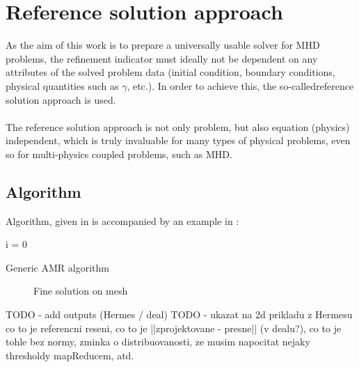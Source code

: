 \section{Reference solution approach}
As the aim of this work is to prepare a universally usable solver for MHD problems, the refinement indicator  must ideally not be dependent on any attributes of the solved problem data (initial condition, boundary conditions, physical quantities such as $\gamma$, etc.). In order to achieve this, the so-called{reference solution} approach is used.
\paragraph{}
The reference solution approach is not only problem, but also equation (physics) independent, which is truly invaluable for many types of physical problems, even so for multi-physics coupled problems, such as MHD.
\subsection{Algorithm}
Algorithm, given in  is accompanied by an example in :\ \\
\begin{algorithm}[H]
\label{AMRRef}
 i = 0\\
 \caption{Generic AMR algorithm}
\end{algorithm}

\begin{figure}[H]
	\begin{center}
		\caption{Fine solution on mesh }
	\label{figure:amrRef1}
	\end{center}
\end{figure}
\vspace{-4mm}


TODO - add outputs (Hermes / deal)
TODO - ukazat na 2d prikladu z Hermesu co to je referencni reseni, co to je ||zprojektovane - presne|| (v dealu?), co to je tohle bez normy, zminka o distribuovanosti, ze musim napocitat nejaky thresholdy mapReducem, atd.
